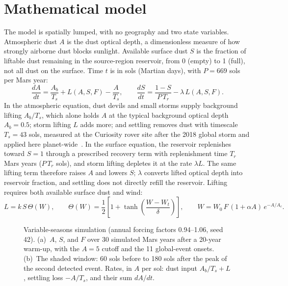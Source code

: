 \section{Mathematical model}
\label{sec:model}

The model is spatially lumped, with no geography and two state variables. Atmospheric dust $A$ is the dust optical depth, a dimensionless measure of how strongly airborne dust blocks sunlight. Available surface dust $S$ is the fraction of liftable dust remaining in the source-region reservoir, from 0 (empty) to 1 (full), not all dust on the surface. Time $t$ is in sols (Martian days), with $P = 669$ sols per Mars year:
\begin{equation}
  \frac{dA}{dt} = \frac{A_b}{T_s} + L(A,S,F) - \frac{A}{T_s}, \qquad
  \frac{dS}{dt} = \frac{1-S}{P\,T_r} - \lambda\,L(A,S,F).
  \label{eq:state}
\end{equation}
In the atmospheric equation, dust devils and small storms supply background lifting $A_b/T_s$, which alone holds $A$ at the typical background optical depth $A_b = 0.5$; storm lifting $L$ adds more; and settling removes dust with timescale $T_s = 43$ sols, measured at the Curiosity rover site after the 2018 global storm and applied here planet-wide~\cite{smith2019}. In the surface equation, the reservoir replenishes toward $S = 1$ through a prescribed recovery term with replenishment time $T_r$ Mars years ($P\,T_r$ sols), and storm lifting depletes it at the rate $\lambda L$. The same lifting term therefore raises $A$ and lowers $S$; $\lambda$ converts lifted optical depth into reservoir fraction, and settling does not directly refill the reservoir. Lifting requires both available surface dust and wind:
\begin{equation}
  L = k\,S\,\Theta(W), \qquad
  \Theta(W) = \frac{1}{2}\left[1 + \tanh\left(\frac{W - W_t}{\delta}\right)\right], \qquad
  W = W_0\,F\,(1 + \alpha A)\,e^{-A/A_c}.
  \label{eq:lifting}
\end{equation}
\begin{figure}[t]
  \centering
  \caption{Variable-seasons simulation (annual forcing factors 0.94--1.06, seed 42). (a)~$A$, $S$, and $F$ over 30 simulated Mars years after a 20-year warm-up, with the $A = 5$ cutoff and the 11 global-event onsets. (b)~The shaded window: 60 sols before to 180 sols after the peak of the second detected event. Rates, in $A$ per sol: dust input $A_b/T_s + L$, settling loss $-A/T_s$, and their sum $dA/dt$.}
  \label{fig:climate-record}
\end{figure}%
